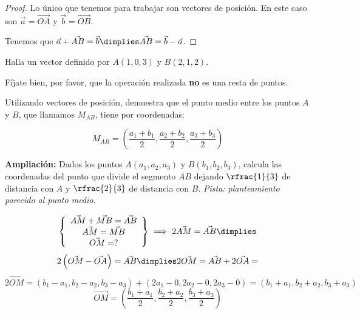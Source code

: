 \begin{proof}
Lo único que tenemos para trabajar son vectores de posición. 
%
En este caso son $\vec{a} = \vec{OA}$ y $\vec{b} = \vec{OB}$. 

Tenemos que $\vec{a} + \vec{AB} = \vec{b} \dimplies \vec{AB} = \vec{b}-\vec{a}$.
\end{proof}

\begin{example}
    Halla un vector definido por $A(1,0,3)$ y $B(2,1,2)$.
    
    \hide{\[\vec{AB} = (2-1, 1-0, 2-3) = (1,1,-1)\]}

    \obs Fíjate bien, por favor, que la operación realizada \textbf{no} es una resta de puntos.
\end{example}

\begin{problem}

Utilizando vectores de posición, demuestra que el punto medio entre los puntos $A$ y $B$, que llamamos $M_{AB}$, tiene por coordenadas:

\[M_{AB} = \left(\frac{a_1+b_1}{2},\frac{a_2+b_2}{2},\frac{a_3+b_3}{2}\right)\]

\ppart \textbf{Ampliación:} Dados los puntos $A(a_1,a_2,a_3)$ y $B(b_1,b_2,b_3)$, calcula las coordenadas del punto que divide el segmento $AB$ dejando $\rfrac{1}{3}$ de distancia con $A$ y $\rfrac{2}{3}$ de distancia con $B$. \textit{Pista: planteamiento parecido al punto medio.}

\solution

\[
\left\{
\begin{array}{c}
    \vec{AM} + \vec{MB} = \vec{AB}\\
    \vec{AM} = \vec{MB}\\
    \vec{OM} = ?
\end{array}\right\}
 \implies 
  2\vec{AM} = \vec{AB} \dimplies
  \]\[ 
  2\left(\vec{OM} - \vec{OA}\right) = \vec{AB} \dimplies
  2\vec{OM} = \vec{AB} + 2\vec{OA} = 
  \]\[
  2\vec{OM} = \left(
  b_1-a_1,
  b_2-a_2,
  b_3-a_3
  \right) + 
  \left(
  2a_1 - 0,
  2a_2 - 0,
  2a_3 - 0
  \right) = 
  \left(
  b_1+a_1,
  b_2+a_2,
  b_3+a_3
  \right)\]\[
  \vec{OM} = \left(
  \frac{b_1+a_1}{2},
  \frac{b_2+a_2}{2},
  \frac{b_3+a_3}{2}
  \right)
\]

\end{problem}



